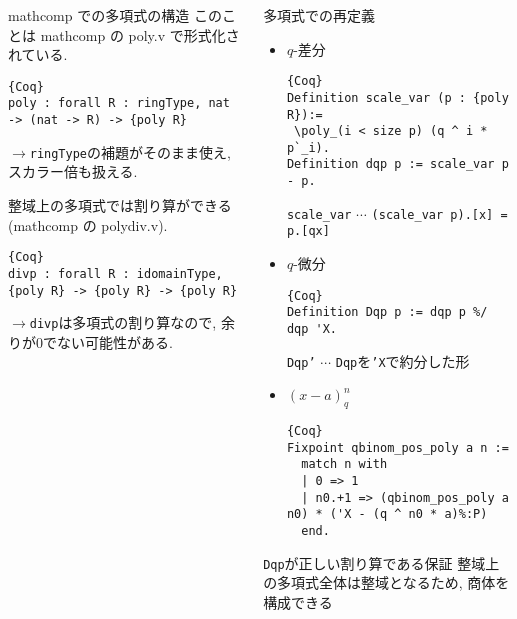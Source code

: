 \documentclass[unicode,mathserif]{beamer}
\begin{document}
\begin{frame}[fragile]
\begin{columns}[T]
\begin{column}{0.33\columnwidth}
\begin{block}{mathcomp での多項式の構造}
			このことは mathcomp の poly.v で形式化されている.
			\begin{lstlisting}{Coq}
poly : forall R : ringType, nat -> (nat -> R) -> {poly R} \end{lstlisting}			
			$\to${\tt ringType}の補題がそのまま使え, スカラー倍も扱える. 
			
			整域上の多項式では割り算ができる(mathcomp の polydiv.v).
			\begin{lstlisting}{Coq}
divp : forall R : idomainType, {poly R} -> {poly R} -> {poly R} \end{lstlisting}
			$\to${\tt divp}は多項式の割り算なので, 余りが$0$でない可能性がある. 
		\end{block}
	\end{column}
	\begin{column}{0.33\columnwidth}
		\begin{block}{多項式での再定義}
			\begin{itemize}
			\item $q$-差分
			\begin{lstlisting}{Coq}
Definition scale_var (p : {poly R}):=
 \poly_(i < size p) (q ^ i * p`_i).
Definition dqp p := scale_var p - p. \end{lstlisting}
		{\tt scale\_var} $\cdots$ {\tt (scale\_var p).[x] = p.[qx]}
			\item $q$-微分
			\begin{lstlisting}{Coq}
Definition Dqp p := dqp p %/ dqp 'X.
\end{lstlisting}
		{\tt Dqp'} $\cdots$ {\tt Dqp}を{\tt 'X}で約分した形
			\item $(x - a)^n_q$
			\begin{lstlisting}{Coq}
Fixpoint qbinom_pos_poly a n :=
  match n with
  | 0 => 1
  | n0.+1 => (qbinom_pos_poly a n0) * ('X - (q ^ n0 * a)%:P)
  end. \end{lstlisting}
  			\end{itemize}
		\end{block}
		
		\begin{block}{{\tt Dqp}が正しい割り算である保証}
%			
			整域上の多項式全体は整域となるため, 商体を構成できる
			

\end{block}
\end{column}
\end{columns}
\end{frame}
\end{document}
